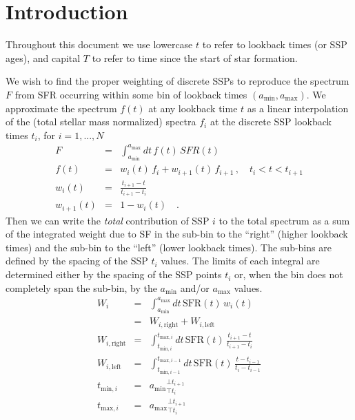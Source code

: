 \documentclass[12pt, letterpaper, preprint]{aastex}
\newcommand{\tmin}[1][]{t_{\mathrm{min} #1}}
\newcommand{\tmax}[1][]{t_{\mathrm{max} #1}}
\newcommand{\amin}{a_{\mathrm{min}}}
\newcommand{\amax} {a_{\mathrm{max}}}
\newcommand{\tintegral}{\int_{\tmin[,i]}^{\tmax[,i]} dt}
\newcommand{\clip}[3][]{{#1}_{\top {#2}}^{\bot {#3}}}
\begin{document}
\author{B. Johnson}


\section{Introduction}
Throughout this document we use lowercase $t$ to refer to lookback times (or SSP ages), and capital $T$ to refer to time since the start of star formation.

We wish to find the proper weighting of discrete SSPs to reproduce the spectrum $F$ from SFR occurring within some bin of  lookback times $(\amin, \amax)$.
We approximate the spectrum $f(t)$ at any lookback time $t$ as a linear interpolation of the (total stellar mass normalized) spectra $f_i$ at the discrete SSP lookback times $t_i$, for $i=1,...,N$ 
\begin{eqnarray}
F & = & \int_{\amin}^{\amax} dt \, f(t) \, SFR(t) \nonumber \\
f(t) & = & w_{i}(t) \, f_i + w_{i+1}(t) \, f_{i+1} \, , \quad t_i < t < t_{i+1}  \nonumber \\
w_{i}(t) & = & \frac{t_{i+1} - t}{t_{i+1}  - t_i} \nonumber \\
w_{i+1}(t) & = & 1 - w_i(t) \quad . \nonumber
\end{eqnarray}
Then we can write the \emph{total} contribution of SSP $i$ to the total spectrum as a sum of the integrated weight due to SF in the sub-bin to the ``right'' (higher lookback times) and the  sub-bin to the ``left'' (lower lookback times).
The sub-bins are defined by the spacing of the SSP $t_i$ values. 
The limits of each integral are determined either by the spacing of the SSP points $t_i$ or, when the bin does not completely span the sub-bin, by the $\amin$ and/or $\amax$ values.
\begin{eqnarray}
W_i & = &  \int_{\amin}^{\amax} dt \, \mathrm{SFR}(t) \, w_i(t) \nonumber \\
 & = & W_{i, \mathrm{right}} + W_{i, \mathrm{left}} \nonumber \\
W_{i, \mathrm{right}} & = & \tintegral \, \mathrm{SFR}(t) \, \frac{t_{i+1} - t}{t_{i+1}  - t_i} \nonumber \\
W_{i, \mathrm{left}} & = & \int_{\tmin[,i-1]}^{\tmax[,i-1]} dt \, \mathrm{SFR}(t) \, \frac{t - t_{i-1}}{t_{i}  - t_{i-1}} \nonumber \\
\tmin[,i] & = & \clip[\amin]{t_i}{t_{i+1}} \nonumber \\
\tmax[,i] & = & \clip[\amax]{t_i}{t_{i+1}} \nonumber
\end{eqnarray}
\end{document}
